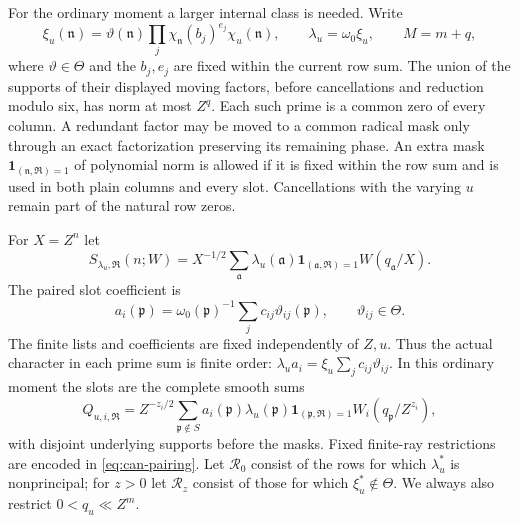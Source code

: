 \documentclass[11pt,a4paper]{article}
\numberwithin{equation}{section}
\theoremstyle{definition}
\theoremstyle{remark}
\begin{document}
For the ordinary moment a larger internal class is needed.  Write
\[
 \xi_u(\mathfrak n)=\vartheta(\mathfrak n)
      \prod_j\chi_{\mathfrak n}(b_j)^{e_j}\chi_u(\mathfrak n),
 \qquad \lambda_u=\omega_0\xi_u,
 \qquad M=m+q,
\]
where $\vartheta\in\Theta$ and the $b_j,e_j$ are fixed within the
current row sum.  The union of the supports of their displayed moving
factors, before cancellations and reduction modulo six, has norm at most
$Z^q$.  Each such prime is a common zero of every column.  A redundant
factor may be moved to a common radical mask only through an exact
factorization preserving its remaining phase.  An extra mask
$\mathbf1_{(\mathfrak n,\mathfrak R)=1}$ of polynomial norm is allowed
if it is fixed within the row sum and is used in both plain columns and
every slot.  Cancellations with the varying $u$ remain part of the natural row zeros.

For $X=Z^n$ let
\[
 S_{\lambda_u,\mathfrak R}(n;W)=X^{-1/2}
   \sum_{\mathfrak a}\lambda_u(\mathfrak a)
      \mathbf1_{(\mathfrak a,\mathfrak R)=1}W(q_{\mathfrak a}/X).
\]
The paired slot coefficient is
\begin{equation}\label{eq:can-pairing}
 a_i(\mathfrak p)=\omega_0(\mathfrak p)^{-1}
     \sum_j c_{ij}\vartheta_{ij}(\mathfrak p),
 \qquad \vartheta_{ij}\in\Theta.
\end{equation}
The finite lists and coefficients are fixed independently of $Z,u$.
Thus the actual character in each prime sum is finite order:
$\lambda_u a_i=\xi_u\sum_jc_{ij}\vartheta_{ij}$.
In this ordinary moment the slots are the complete smooth sums
\[
 Q_{u,i,\mathfrak R}
 =Z^{-z_i/2}\sum_{\mathfrak p\notin S}
   a_i(\mathfrak p)\lambda_u(\mathfrak p)
   \mathbf1_{(\mathfrak p,\mathfrak R)=1}
   W_i(q_{\mathfrak p}/Z^{z_i}),
\]
with disjoint underlying supports before the masks.
Fixed finite-ray restrictions are encoded in \eqref{eq:can-pairing}.
Let $\mathcal R_0$ consist of the rows for which $\lambda_u^*$ is
nonprincipal; for $z>0$ let $\mathcal R_z$ consist of those for which
$\xi_u^*\notin\Theta$.  We always also restrict $0<q_u\ll Z^m$.
\end{document}
